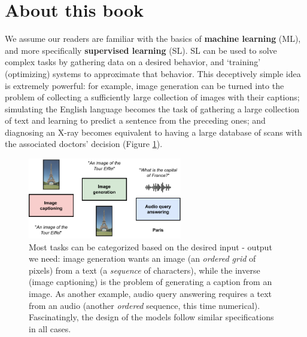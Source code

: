\section*{About this book}

We assume our readers are familiar with the basics of \textbf{machine learning} (ML), and more specifically \textbf{supervised learning} (SL). SL can be used to solve complex tasks by gathering data on a desired behavior, and `training' (optimizing) systems to approximate that behavior. This deceptively simple idea is extremely powerful: for example, image generation can be turned into the problem of collecting a sufficiently large collection of images with their captions; simulating the English language becomes the task of gathering a large collection of text and learning to predict a sentence from the preceding ones; and diagnosing an X-ray becomes equivalent to having a large database of scans with the associated doctors’ decision (Figure \ref{fig:examples}).

\begin{figure}
    \centering
    \includegraphics[width=0.6\textwidth]{images/examples.pdf}
    \caption{Most tasks can be categorized based on the desired input - output we need: {\color{drawgreen}image generation} wants an image (an \textit{ordered grid} of pixels) from a text (a \textit{sequence} of characters), while the inverse ({\color{drawred}image captioning}) is the problem of generating a caption from an image. As another example, {\color{drawblue}audio query answering} requires a text from an audio (another \textit{ordered} sequence, this time numerical). Fascinatingly, the design of the models follow similar specifications in all cases.}
    \label{fig:examples}
\end{figure}


